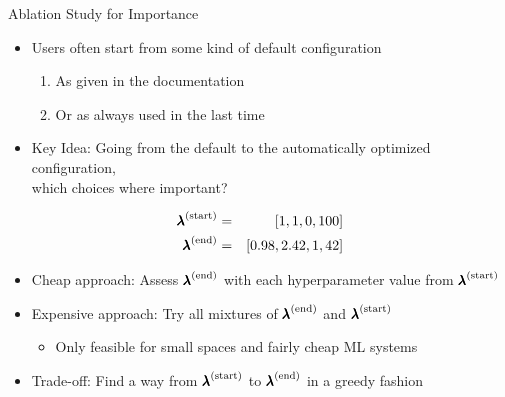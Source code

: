 \begin{frame}[c]{Ablation Study for Importance}

\begin{itemize}
	\item Users often start from some kind of default configuration
	\begin{enumerate}
		\item As given in the documentation 
		\item Or as always used in the last time
	\end{enumerate}
    \pause
	\item \alert{Key Idea}: Going from the default to the automatically optimized configuration,\\
	 which choices where important?
\end{itemize}

\begin{eqnarray}
{\pmb{\lambda}}^{(\text{start})} &=& [1, 1, 0, 100]  \nonumber\\
{\pmb{\lambda}}^{(\text{end})} &=& [0.98, 2.42, 1, 42]  \nonumber
\end{eqnarray}

\pause
\begin{itemize}
	\item Cheap approach: Assess ${\pmb{\lambda}}^{(\text{end})}$ with each hyperparameter value from ${\pmb{\lambda}}^{(\text{start})}$
	\pause
	\item Expensive approach: Try all mixtures of ${\pmb{\lambda}}^{(\text{end})}$ and ${\pmb{\lambda}}^{(\text{start})}$
	\begin{itemize}
		\item  Only feasible for small spaces and fairly cheap ML systems
	\end{itemize}
	\pause
	\item Trade-off: Find a way from ${\pmb{\lambda}}^{(\text{start})}$ to ${\pmb{\lambda}}^{(\text{end})}$ in a greedy fashion 
\end{itemize}

\end{frame}
